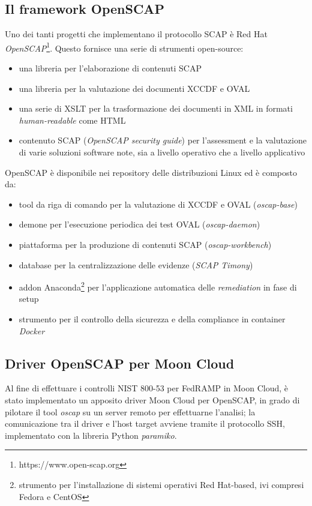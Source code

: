 \documentclass[../main.tex]{subfiles}
\begin{document}
\subsection{Il framework OpenSCAP}
Uno dei tanti progetti che implementano il protocollo SCAP è Red Hat \textit{OpenSCAP}\footnote{https://www.open-scap.org}.
Questo fornisce una serie di strumenti open-source:
\begin{itemize}
    \item una libreria per l'elaborazione di contenuti SCAP
    \item una libreria per la valutazione dei documenti XCCDF e OVAL
    \item una serie di XSLT per la trasformazione dei documenti in XML in formati \textit{human-readable} come HTML
    \item contenuto SCAP (\textit{OpenSCAP security guide}) per l'assessment e la valutazione di varie soluzioni software note, sia a livello operativo che a livello applicativo
\end{itemize}

OpenSCAP è disponibile nei repository delle distribuzioni Linux ed è composto da:
\begin{itemize}
    \item tool da riga di comando per la valutazione di XCCDF e OVAL (\textit{oscap-base})
    \item demone per l'esecuzione periodica dei test OVAL (\textit{oscap-daemon})
    \item piattaforma per la produzione di contenuti SCAP (\textit{oscap-workbench})
    \item database per la centralizzazione delle evidenze (\textit{SCAP Timony})
    \item addon Anaconda\footnote{strumento per l'installazione di sistemi operativi Red Hat-based, ivi compresi Fedora e CentOS} per l'applicazione automatica delle \textit{remediation} in fase di setup
    \item strumento per il controllo della sicurezza e della compliance in container \textit{Docker}
\end{itemize}


\vfill
\subsection{Driver OpenSCAP per Moon Cloud}
\label{sec:openscapmooncloud}
Al fine di effettuare i controlli NIST 800-53 per FedRAMP in Moon Cloud, è stato implementato un apposito driver Moon Cloud per OpenSCAP, in grado di pilotare il tool \textit{oscap} su un server remoto per effettuarne l'analisi; la comunicazione tra il driver e l'host target avviene tramite il protocollo SSH, implementato con la libreria Python \textit{paramiko}.
\end{document}
